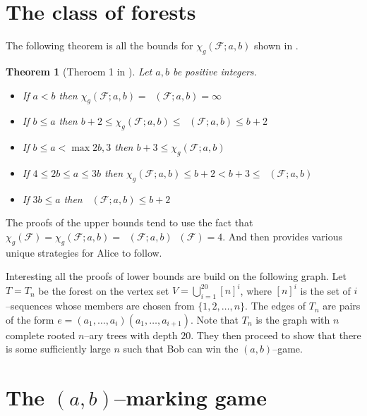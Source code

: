\documentclass[11pt]{article}
\numberwithin{figure}{section}
\newtheorem{theorem}{Theorem}
\theoremstyle{definition}
\newcommand{\FF}{\mathcal{F}} %
\DeclareMathOperator{\col}{col_g}
\begin{document}
    \section{The class of forests}
    The following theorem is all the bounds for $\chi_g(\FF;a,b)$ shown in \cite{kierstead2005}.    
    \begin{theorem} [Theroem 1 in \cite{kierstead2005}]
        Let $a,b$ be positive integers.
        \begin{itemize}
            \item If $a<b$ then $\chi_g(\FF;a,b)=\col(\FF;a,b)=\infty$
            \item If $b\leq a$ then $b+2\leq \chi_g(\FF;a,b)\leq \col(\FF;a,b)\leq b+2$    
            \item If $b\leq a < \max{2b,3}$ then $b+3 \leq \chi_g(\FF;a,b)$
            \item If $4\leq 2b \leq a \leq 3b$ then $\chi_g(\FF;a,b)\leq b+2<b+3\leq \col(\FF;a,b)$
            \item If $3b\leq a$ then $\col(\FF;a,b)\leq b+2$ 
        \end{itemize}
    \end{theorem}
    
    The proofs of the upper bounds tend to use the fact that $\chi_g(\FF)=\chi_g(\FF;a,b)= \col(\FF;a,b)\col(\FF)=4$. And then provides various unique strategies for Alice to follow.
    
    Interesting all the proofs of lower bounds are build on the following graph. Let $T=T_n$ be the forest on the vertex set $V=\bigcup_{i=1}^{20}[n]^i$, where $[n]^i$ is the set of $i$--sequences whose members are chosen from $\{1,2,\dots,n\}$. %
    The edges of $T_n$ are pairs of the form $e= (a_1,\dots,a_i) (a_1,\dots,a_{i+1})$. Note that $T_n$ is the graph with $n$ complete rooted $n$--ary trees with depth $20$. They then proceed to show that there is some sufficiently large $n$ such that Bob can win the $(a,b)$--game.
    
    
    \section{The $(a,b)$--marking game}
    
\end{document}
